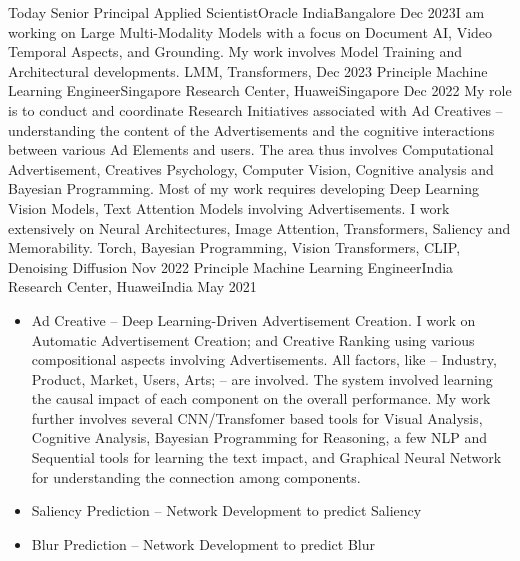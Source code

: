 %
%
%

\begin{experiences}
			\experience
	{Today} {Senior Principal Applied Scientist}{Oracle India}{Bangalore}
	{Dec 2023}{I am working on Large Multi-Modality Models with a focus on Document AI, Video Temporal Aspects, and Grounding. My work involves Model Training and Architectural developments.
	}
	{LMM, Transformers,}
	\emptySeparator
		\experience
	{Dec 2023} {Principle Machine Learning Engineer}{Singapore Research Center, Huawei}{Singapore}
	{Dec 2022}{
		My role is to conduct and coordinate Research Initiatives associated with Ad Creatives -- understanding the content of the Advertisements and the cognitive interactions between various Ad Elements and users. The area thus involves Computational Advertisement, Creatives Psychology, Computer Vision, Cognitive analysis and Bayesian Programming. Most of my work requires developing Deep Learning Vision Models, Text Attention Models involving Advertisements. I work extensively on Neural Architectures, Image Attention, Transformers, Saliency and Memorability.
	}
	{Torch, Bayesian Programming, Vision Transformers, CLIP, Denoising Diffusion }
	\emptySeparator
	\experience
	{Nov 2022} {Principle Machine Learning Engineer}{India Research Center, Huawei}{India}
	{May 2021}{
		\begin{itemize}
			\item Ad Creative -- Deep Learning-Driven Advertisement Creation. I work on Automatic Advertisement Creation; and Creative Ranking using various compositional aspects involving Advertisements. All factors, like -- Industry, Product, Market, Users, Arts; -- are involved. The system involved learning the causal impact of each component on the overall performance. My work further involves several CNN/Transfomer based tools for Visual Analysis, Cognitive Analysis, Bayesian Programming for Reasoning, a few NLP and Sequential tools for learning the text impact, and Graphical Neural Network for understanding the connection among components.
			\item Saliency Prediction -- Network Development to predict Saliency
			\item Blur Prediction -- Network Development to predict Blur

\end{itemize}}
\end{experiences}
